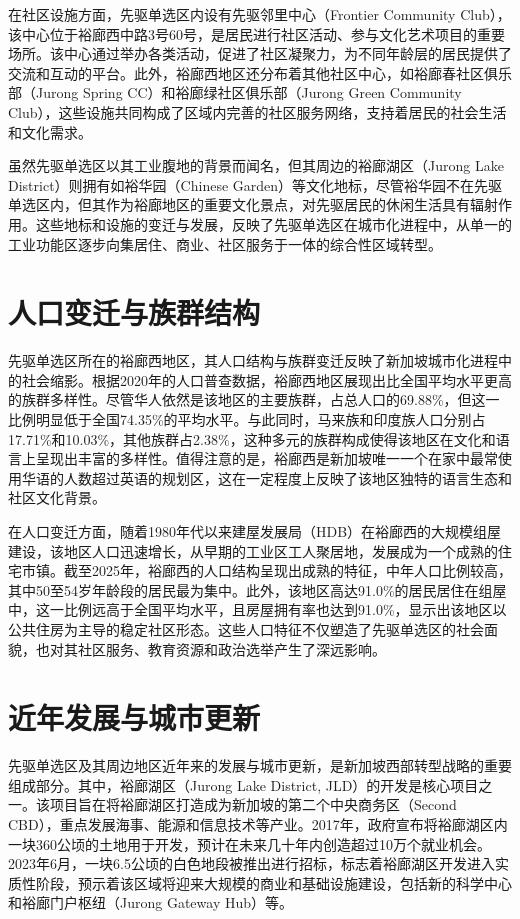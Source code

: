 \documentclass[11pt,a4paper,twoside,openany]{book}
\begin{document}
在社区设施方面，先驱单选区内设有先驱邻里中心（Frontier Community Club），该中心位于裕廊西中路3号60号，是居民进行社区活动、参与文化艺术项目的重要场所。该中心通过举办各类活动，促进了社区凝聚力，为不同年龄层的居民提供了交流和互动的平台。此外，裕廊西地区还分布着其他社区中心，如裕廊春社区俱乐部（Jurong Spring CC）和裕廊绿社区俱乐部（Jurong Green Community Club），这些设施共同构成了区域内完善的社区服务网络，支持着居民的社会生活和文化需求。

虽然先驱单选区以其工业腹地的背景而闻名，但其周边的裕廊湖区（Jurong Lake District）则拥有如裕华园（Chinese Garden）等文化地标，尽管裕华园不在先驱单选区内，但其作为裕廊地区的重要文化景点，对先驱居民的休闲生活具有辐射作用。这些地标和设施的变迁与发展，反映了先驱单选区在城市化进程中，从单一的工业功能区逐步向集居住、商业、社区服务于一体的综合性区域转型。

\section{人口变迁与族群结构}
先驱单选区所在的裕廊西地区，其人口结构与族群变迁反映了新加坡城市化进程中的社会缩影。根据2020年的人口普查数据，裕廊西地区展现出比全国平均水平更高的族群多样性。尽管华人依然是该地区的主要族群，占总人口的69.88\%，但这一比例明显低于全国74.35\%的平均水平。与此同时，马来族和印度族人口分别占17.71\%和10.03\%，其他族群占2.38\%，这种多元的族群构成使得该地区在文化和语言上呈现出丰富的多样性。值得注意的是，裕廊西是新加坡唯一一个在家中最常使用华语的人数超过英语的规划区，这在一定程度上反映了该地区独特的语言生态和社区文化背景。

在人口变迁方面，随着1980年代以来建屋发展局（HDB）在裕廊西的大规模组屋建设，该地区人口迅速增长，从早期的工业区工人聚居地，发展成为一个成熟的住宅市镇。截至2025年，裕廊西的人口结构呈现出成熟的特征，中年人口比例较高，其中50至54岁年龄段的居民最为集中。此外，该地区高达91.0\%的居民居住在组屋中，这一比例远高于全国平均水平，且房屋拥有率也达到91.0\%，显示出该地区以公共住房为主导的稳定社区形态。这些人口特征不仅塑造了先驱单选区的社会面貌，也对其社区服务、教育资源和政治选举产生了深远影响。

\section{近年发展与城市更新}
先驱单选区及其周边地区近年来的发展与城市更新，是新加坡西部转型战略的重要组成部分。其中，裕廊湖区（Jurong Lake District, JLD）的开发是核心项目之一。该项目旨在将裕廊湖区打造成为新加坡的第二个中央商务区（Second CBD），重点发展海事、能源和信息技术等产业。2017年，政府宣布将裕廊湖区内一块360公顷的土地用于开发，预计在未来几十年内创造超过10万个就业机会。2023年6月，一块6.5公顷的白色地段被推出进行招标，标志着裕廊湖区开发进入实质性阶段，预示着该区域将迎来大规模的商业和基础设施建设，包括新的科学中心和裕廊门户枢纽（Jurong Gateway Hub）等。
\end{document}
